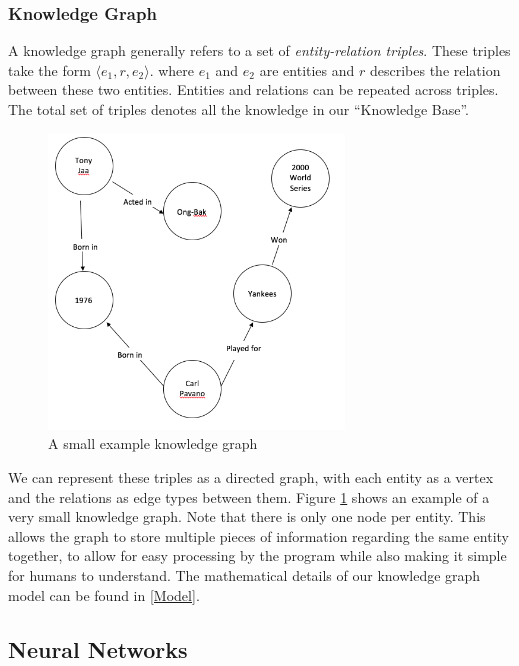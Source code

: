 \documentclass[pageno]{jpaper}
\begin{document}
\subsubsection{Knowledge Graph}
\label{Knowledge Graph}

A knowledge graph generally refers to a set of \textit{entity-relation triples}.
These triples take the form $\langle e_1, r, e_2 \rangle$. where $e_1$ and $e_2$
are entities and $r$ describes the relation between these two entities. Entities
and relations can be repeated across triples. The total set of triples denotes
all the knowledge in our ``Knowledge Base''.

\begin{figure}
    \centering
    \includegraphics[width=0.7\textwidth,keepaspectratio]{figures/Example_KG.png}
    \caption{A small example knowledge graph}
    \label{Figure: KG}
\end{figure}

We can represent these triples as a directed graph, with each entity as a vertex
and the relations as edge types between them. Figure \ref{Figure: KG} shows an
example of a very small knowledge graph. Note that there is only one node per
entity. This allows the graph to store multiple pieces of information regarding
the same entity together, to allow for easy processing by the program while also
making it simple for humans to understand. The mathematical details of our
knowledge graph model can be found in \ref{Model}.

\subsection{Neural Networks}
\label{Neural Networks}
\end{document}
